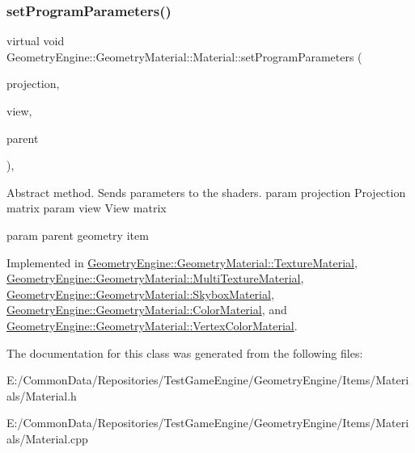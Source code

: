 \subsubsection{\texorpdfstring{setProgramParameters()}{setProgramParameters()}}
{\footnotesize\ttfamily virtual void Geometry\+Engine\+::\+Geometry\+Material\+::\+Material\+::set\+Program\+Parameters (\begin{DoxyParamCaption}\item[{const Q\+Matrix4x4 \&}]{projection,  }\item[{const Q\+Matrix4x4 \&}]{view,  }\item[{const \mbox{\hyperlink{class_geometry_engine_1_1_geometry_world_item_1_1_geometry_item_1_1_geometry_item}{Geometry\+World\+Item\+::\+Geometry\+Item\+::\+Geometry\+Item}} \&}]{parent }\end{DoxyParamCaption})\hspace{0.3cm}{\ttfamily [protected]}, {}}

Abstract method. Sends parameters to the shaders. param projection Projection matrix param view View matrix

param parent geometry item 

Implemented in \mbox{\hyperlink{class_geometry_engine_1_1_geometry_material_1_1_texture_material_a985cdde7240f2acb18cd2944c5ca6193}{Geometry\+Engine\+::\+Geometry\+Material\+::\+Texture\+Material}}, \mbox{\hyperlink{class_geometry_engine_1_1_geometry_material_1_1_multi_texture_material_a5f07e3b2b0867d3905f912159ef2f67b}{Geometry\+Engine\+::\+Geometry\+Material\+::\+Multi\+Texture\+Material}}, \mbox{\hyperlink{class_geometry_engine_1_1_geometry_material_1_1_skybox_material_a7760402d819462db205dadf3f370af73}{Geometry\+Engine\+::\+Geometry\+Material\+::\+Skybox\+Material}}, \mbox{\hyperlink{class_geometry_engine_1_1_geometry_material_1_1_color_material_afc9bcbd2091f6592dfb8a6ace1d4adfb}{Geometry\+Engine\+::\+Geometry\+Material\+::\+Color\+Material}}, and \mbox{\hyperlink{class_geometry_engine_1_1_geometry_material_1_1_vertex_color_material_a11bf01fb1d5ef41fb1a9cf4080c98b8c}{Geometry\+Engine\+::\+Geometry\+Material\+::\+Vertex\+Color\+Material}}.



The documentation for this class was generated from the following files\+:\begin{DoxyCompactItemize}
\item 
E\+:/\+Common\+Data/\+Repositories/\+Test\+Game\+Engine/\+Geometry\+Engine/\+Items/\+Materials/Material.\+h\item 
E\+:/\+Common\+Data/\+Repositories/\+Test\+Game\+Engine/\+Geometry\+Engine/\+Items/\+Materials/Material.\+cpp\end{DoxyCompactItemize}
